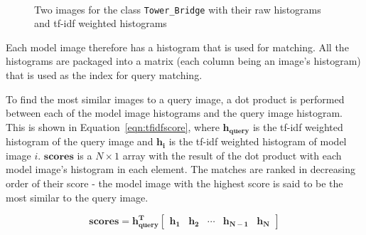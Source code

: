 \documentclass[11pt, onecolumn, a4paper, final]{report} %
\begin{document}
\begin{figure}[htb]
~
~
\caption{Two images for the class \lstinline!Tower_Bridge! with their raw histograms and tf-idf weighted histograms}
\label{fig:histograms}
\end{figure}

Each model image therefore has a histogram that is used for matching. All the histograms are packaged into a matrix (each column being an image's histogram) that is used as the index for query matching.

To find the most similar images to a query image, a dot product is performed between each of the model image histograms and the query image histogram. This is shown in Equation~\ref{eqn:tfidfscore}, where $\mathbf{h_{query}}$ is the tf-idf weighted histogram of the query image and $\mathbf{h_i}$ is the tf-idf weighted histogram of model image $i$. $\mathbf{scores}$ is a $N\times1$ array with the result of the dot product with each model image's histogram in each element. The matches are ranked in decreasing order of their score - the model image with the highest score is said to be the most similar to the query image.

\begin{equation}
\mathbf{scores}= \mathbf{h_{query}^T}
\left[ \begin{array}{ccccc}
\mathbf{h_1} & \mathbf{h_2} & \cdots & \mathbf{h_{N-1}} & \mathbf{h_N}
\end{array}\right]
\label{eqn:tfidfscore}
\end{equation} 
\end{document}
